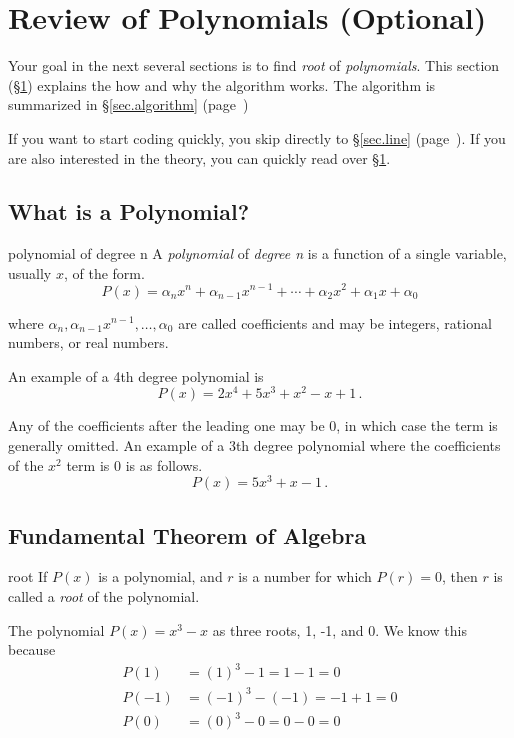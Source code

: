 \section{Review of Polynomials (Optional)}
\label{sec.general}

Your goal in the next several sections is to find \emph{root} of
\emph{polynomials}.  This section (\S\ref{sec.general}) explains
the how and why the algorithm works.  The algorithm is summarized
in \S\ref{sec.algorithm} (page~\pageref{sec.algorithm})

If you want to start coding quickly, you skip directly to
\S\ref{sec.line} (page~\pageref{sec.line}).  If you are also
interested in the theory, you can quickly read over
\S\ref{sec.general}.


\subsection{What is a Polynomial?}

\begin{definition}{polynomial of degree n}{}
  A \emph{polynomial} of \emph{degree n} is a function of a single
  variable, usually $x$, of the form.
  \[P(x) = \alpha_n x^n + \alpha_{n-1} x^{n-1} + \cdots + \alpha_2 x^2 + \alpha_1 x + \alpha_0 \]

  where $\alpha_n, \alpha_{n-1} x^{n-1}, \ldots, \alpha_0$ are called
  coefficients and may be integers, rational numbers, or real numbers.
\end{definition}

An example of a 4th degree polynomial is
\[P(x) = 2 x^4 + 5 x^3 + x^2 - x + 1\,.\]


Any of the coefficients after the leading one may be 0, in which case
the term is generally omitted.  An example of a 3th degree polynomial
where the coefficients of the $x^2$ term is 0 is as follows.
\[P(x) = 5 x^3 + x - 1\,.\]

\subsection{Fundamental Theorem of Algebra}

\begin{definition}{root}{}
  If $P(x)$ is a polynomial, and $r$ is a number for which $P(r)=0$,
  then $r$ is called a \emph{root} of the polynomial.
\end{definition}

The polynomial $P(x) = x^3 - x$ as three roots, 1, -1, and 0.  We know
this because
\begin{align*}
  P(1) &= (1)^3 - 1 
  = 1 - 1 
  = 0\\[3pt]
  P(-1) &= (-1)^3 - (-1) 
  = -1 + 1 
  = 0\\[3pt]
  P(0) &= (0)^3 - 0
  = 0 - 0 
  = 0  
\end{align*}

